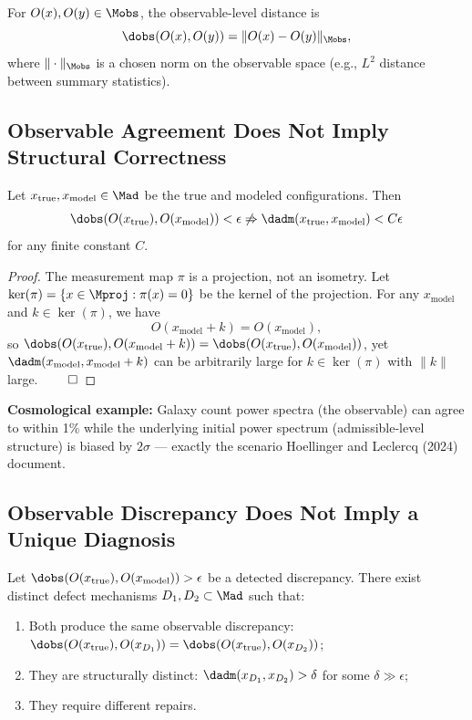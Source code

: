 \begin{definition}
For $O(x), O(y) \in \Mobs$, the observable-level distance is
\[
\dobs(O(x), O(y)) = \|O(x) - O(y)\|_{\Mobs},
\]
where $\|\cdot\|_{\Mobs}$ is a chosen norm on the observable space (e.g., $L^2$ distance between summary statistics).
\end{definition}


\subsection{Observable Agreement Does Not Imply Structural Correctness}

\begin{theorem}
Let $x_{\mathrm{true}}, x_{\mathrm{model}} \in \Mad$ be the true and modeled configurations. Then
\[
\dobs(O(x_{\mathrm{true}}), O(x_{\mathrm{model}})) < \epsilon \not\Rightarrow \dadm(x_{\mathrm{true}}, x_{\mathrm{model}}) < C\epsilon
\]
for any finite constant $C$.
\end{theorem}

\begin{proof}
The measurement map $\pi$ is a projection, not an isometry. Let $\ker(\pi) = \{x \in \Mproj : \pi(x) = 0\}$ be the kernel of the projection. For any $x_{\mathrm{model}}$ and $k \in \ker(\pi)$, we have
\[
O(x_{\mathrm{model}} + k) = O(x_{\mathrm{model}}),
\]
so $\dobs(O(x_{\mathrm{true}}), O(x_{\mathrm{model}} + k)) = \dobs(O(x_{\mathrm{true}}), O(x_{\mathrm{model}}))$, yet $\dadm(x_{\mathrm{model}}, x_{\mathrm{model}} + k)$ can be arbitrarily large for $k \in \ker(\pi)$ with $\|k\|$ large. $\qed$
\end{proof}

\textbf{Cosmological example:} Galaxy count power spectra (the observable) can agree to within 1\% while the underlying initial power spectrum (admissible-level structure) is biased by $2\sigma$ --- exactly the scenario Hoellinger and Leclercq (2024) document.


\subsection{Observable Discrepancy Does Not Imply a Unique Diagnosis}

\begin{proposition}
Let $\dobs(O(x_{\mathrm{true}}), O(x_{\mathrm{model}})) > \epsilon$ be a detected discrepancy. There exist distinct defect mechanisms $D_1, D_2 \subset \Mad$ such that:
\begin{enumerate}
\item Both produce the same observable discrepancy: $\dobs(O(x_{\mathrm{true}}), O(x_{D_1})) = \dobs(O(x_{\mathrm{true}}), O(x_{D_2}))$;
\item They are structurally distinct: $\dadm(x_{D_1}, x_{D_2}) > \delta$ for some $\delta \gg \epsilon$;
\item They require different repairs.
\end{enumerate}
\end{proposition}

